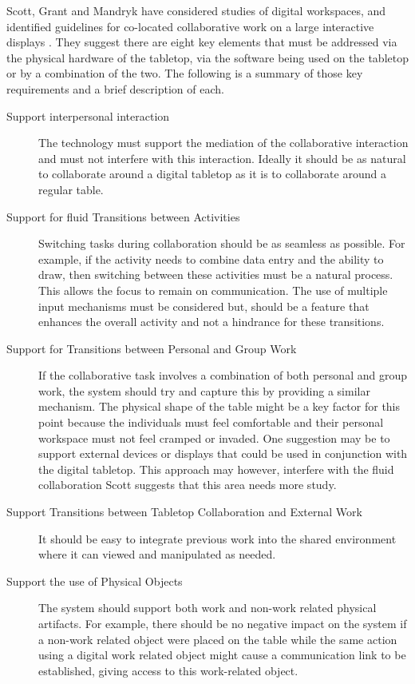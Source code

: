 \documentclass[lnbip,sechang,a4paper]{svmultln}
\begin{document}
Scott, Grant and Mandryk have considered studies of digital
workspaces, and identified guidelines for co-located collaborative
work on a large interactive displays \cite{ScottGuidelines}.  They
suggest there are eight key elements that must be addressed via the
physical hardware of the tabletop, via the software being used on the
tabletop or by a combination of the two. The following is a summary of
those key requirements and a brief description of each.


\begin{description}
\item[Support interpersonal interaction] The technology must support
  the mediation of the collaborative interaction and must not
  interfere with this interaction. Ideally it should be as natural to
  collaborate around a digital tabletop as it is to collaborate around
  a regular table.

\item[Support for fluid Transitions between Activities] Switching
  tasks during collaboration should be as seamless as possible. For
  example, if the activity needs to combine data entry and the ability
  to draw, then switching between these activities must be a natural
  process. This allows the focus to remain on communication. The use
  of multiple input mechanisms must be considered but, should be a
  feature that enhances the overall activity and not a hindrance for
  these transitions.

\item[Support for Transitions between Personal and Group Work] If the
  collaborative task involves a combination of both personal and group
  work, the system should try and capture this by providing a similar
  mechanism. The physical shape of the table might be a key factor for
  this point because the individuals must feel comfortable and their
  personal workspace must not feel cramped or invaded. One suggestion
  may be to support external devices or displays that could be used in
  conjunction with the digital tabletop. This approach may however,
  interfere with the fluid collaboration Scott suggests that this area
  needs more study.

\item[Support Transitions between Tabletop Collaboration and External
  Work] It should be easy to integrate previous work into the shared
  environment where it can viewed and manipulated as needed.

\item[Support the use of Physical Objects] The system should support
  both work and non-work related physical artifacts. For example,
  there should be no negative impact on the system if a non-work
  related object were placed on the table while the same action using
  a digital work related object might cause a communication link to be
  established, giving access to this work-related object.


\end{description}
\end{document}
